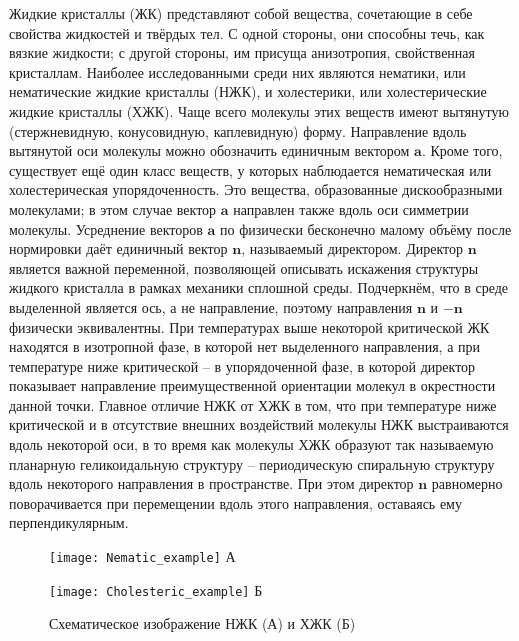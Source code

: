 Жидкие кристаллы (ЖК) представляют собой вещества, сочетающие в себе свойства жидкостей и твёрдых тел.
С одной стороны, они способны течь, как вязкие жидкости; с другой стороны, им присуща анизотропия, свойственная кристаллам.
Наиболее исследованными среди них являются нематики, или нематические жидкие кристаллы (НЖК), и холестерики, или холестерические жидкие кристаллы (ХЖК).
Чаще всего молекулы этих веществ имеют вытянутую (стержневидную, конусовидную, каплевидную) форму.
Направление вдоль вытянутой оси молекулы можно обозначить единичным вектором $\textbf{a}$.
Кроме того, существует ещё один класс веществ, у которых наблюдается нематическая или холестерическая упорядоченность.
Это вещества, образованные дискообразными молекулами; в этом случае вектор $\textbf{a}$ направлен также вдоль оси симметрии молекулы.
Усреднение векторов $\textbf{a}$ по физически бесконечно малому объёму после нормировки даёт единичный вектор $\textbf{n}$, называемый директором.
Директор $\textbf{n}$ является важной переменной, позволяющей описывать искажения структуры жидкого кристалла в рамках механики сплошной среды.
Подчеркнём, что в среде выделенной является ось, а не направление, поэтому направления $\textbf{n}$ и $-\textbf{n}$ физически эквивалентны.
При температурах выше некоторой критической ЖК находятся в изотропной фазе, в которой нет выделенного направления, а при температуре ниже критической -- в упорядоченной фазе, в которой директор показывает направление преимущественной ориентации молекул в окрестности данной точки.
Главное отличие НЖК от ХЖК в том, что при температуре ниже критической и в отсутствие внешних воздействий молекулы НЖК выстраиваются вдоль некоторой оси, в то время как молекулы ХЖК образуют так называемую планарную геликоидальную структуру -- периодическую спиральную структуру вдоль некоторого направления в пространстве.
При этом директор $\textbf{n}$ равномерно поворачивается при перемещении вдоль этого направления, оставаясь ему перпендикулярным.
\begin{figure}
	\begin{minipage}{0.49\textwidth}
		\centering
		\texttt{[image: Nematic\_example]}
		{А}
	\end{minipage}
	\hfill
	\begin{minipage}{0.49\textwidth}
		\centering
		\texttt{[image: Cholesteric\_example]}
		{Б}
	\end{minipage}
	\vspace{0.5cm}
	\caption{Схематическое изображение НЖК (А) и ХЖК (Б)}
\end{figure}

